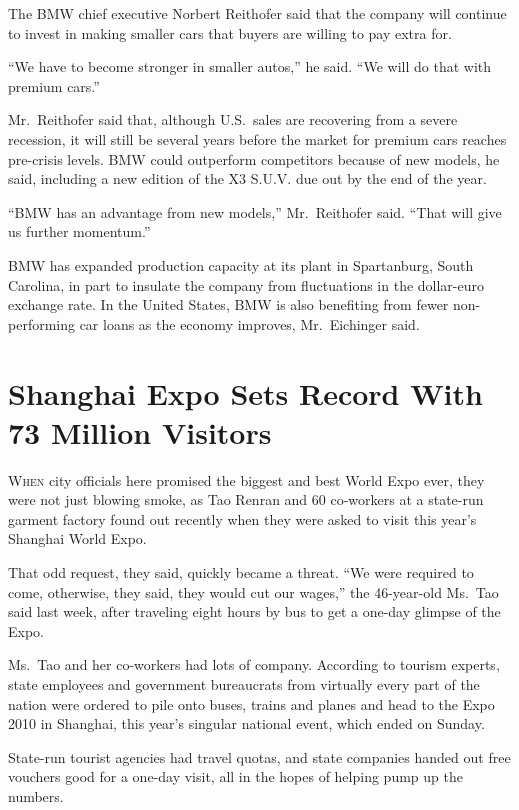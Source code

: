 ﻿\documentclass[12pt]{article}
\begin{document}
The BMW chief executive Norbert Reithofer said that the company will continue to invest in making
smaller cars that buyers are willing to pay extra for.

``We have to become stronger in smaller autos,'' he said. ``We will do that with premium cars.''

Mr.~Reithofer said that, although U.S.~sales are recovering from a severe recession, it will still
be several years before the market for premium cars reaches pre-crisis levels. BMW could outperform
competitors because of new models, he said, including a new edition of the X3 S.U.V. due out by the
end of the year.

``BMW has an advantage from new models,'' Mr.~Reithofer said. ``That will give us further
momentum.''

BMW has expanded production capacity at its plant in Spartanburg, South Carolina, in part to
insulate the company from fluctuations in the dollar-euro exchange rate. In the United States, BMW
is also benefiting from fewer non-performing car loans as the economy improves, Mr.~Eichinger said.

\section{Shanghai Expo Sets Record With 73 Million Visitors}

\lettrine{W}{hen} city officials here promised the biggest and best World
Expo ever, they were not just blowing smoke, as Tao Renran and 60 co-workers at a state-run garment
factory found out recently when they were asked to visit this year's Shanghai World Expo.

That odd request, they said, quickly became a threat. ``We were required to come, otherwise, they
said, they would cut our wages,'' the 46-year-old Ms.~Tao said last week, after traveling eight
hours by bus to get a one-day glimpse of the Expo.

Ms.~Tao and her co-workers had lots of company. According to tourism experts, state employees and
government bureaucrats from virtually every part of the nation were ordered to pile onto buses,
trains and planes and head to the Expo 2010 in Shanghai, this year's singular national event, which
ended on Sunday.

State-run tourist agencies had travel quotas, and state companies handed out free vouchers good for
a one-day visit, all in the hopes of helping pump up the numbers.
\end{document}
